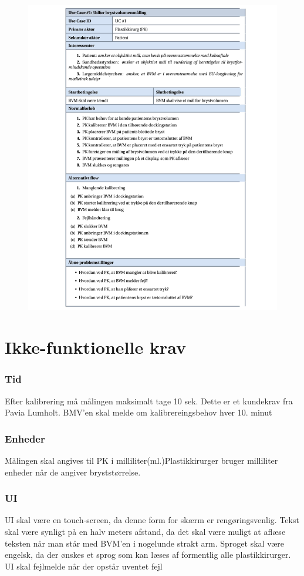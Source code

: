   			\begin{figure}[htb]
  				\flushleft
  					\includegraphics[width=7in]{UC1tabel}
  			\end{figure}
  			
	
	\section{Ikke-funktionelle krav}
	
		\subsubsection{Tid}
 		Efter kalibrering må målingen maksimalt tage 10 sek. Dette er et kundekrav fra Pavia Lumholt.
 		BMV'en skal melde om kalibrereingsbehov hver 10. minut
		\subsubsection{Enheder}
 		Målingen skal angives til PK i milliliter(ml.)Plastikkirurger bruger milliliter enheder når de angiver bryststørrelse. 
 		\subsubsection{UI}
 		UI skal være en touch-screen, da denne form for skærm er rengøringsvenlig. 
 		Tekst skal være synligt på en halv meters afstand, da det skal være muligt at aflæse teksten når man står med BVM'en i nogelunde strakt arm.
 		Sproget skal være engelsk, da der ønskes et sprog som kan læses af formentlig alle plastikkirurger.
		 UI skal fejlmelde når der opstår uventet fejl 
